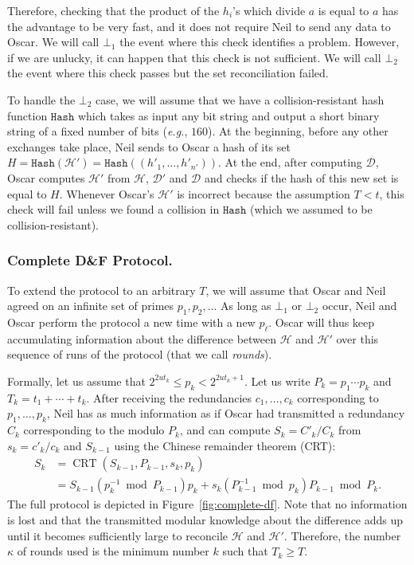 \documentclass[twoside,envcountsame,runningheads]{llncs}
\newcommand{\Set}{\mathcal{H}}
\newcommand{\SetD}{\mathcal{D}}
\newcommand{\df}{D\&F\xspace}
\newcommand{\eg}{\textit{e.g.}\xspace}
\newcommand{\Hash}{\ensuremath{\mathtt{Hash}}}
\DeclareMathOperator{\CRT}{CRT}
\begin{document}
Therefore, checking that the product of the $h_i$'s which divide $a$ is equal to $a$ has the advantage to be very fast, and it does not require Neil to send any data to Oscar. We will call $\bot_1$ the event where this check identifies a problem. 
However, if we are unlucky, it can happen that this check is not sufficient. We will call $\bot_2$ the event where this check passes but the set reconciliation failed.

To handle the $\bot_2$ case, we will assume that we have a collision-resistant hash function $\Hash$ which takes as input any bit string and output a short binary string of a fixed number of bits (\eg, $160$).
At the beginning, before any other exchanges take place, Neil sends to Oscar a hash of its set $H = \Hash(\Set') = \Hash((h'_1,\dots,h'_{n'}))$. At the end, after computing $\SetD$, Oscar computes $\Set'$ from $\Set$, $\SetD'$ and $\SetD$ and checks if the hash of this new set is equal to $H$.
Whenever Oscar's $\Set'$ is incorrect because the assumption $T < t$, this check will fail unless we found a collision in $\Hash$ (which we assumed to be collision-resistant).

\subsubsection{Complete \df Protocol.}
\label{sec:complete-df}

To extend the protocol to an arbitrary $T$, we will assume that Oscar and Neil agreed on an infinite set of primes $p_1,p_2,\ldots$ As long as $\bot_1$ or $\bot_2$ occur, Neil and Oscar perform the protocol a new time with a new $p_\ell$. Oscar will thus keep accumulating information about the difference between $\Set$ and $\Set'$ over this sequence of runs of the protocol (that we call \emph{rounds}).

Formally, let us assume that $2^{2 u t_k} \le p_k < 2^{2 u t_k +1}$.
Let us write $P_k = p_1 \cdots p_k$ and $T_k = t_1 + \cdots + t_k$.
After receiving the redundancies $c_1,\dots,c_k$ corresponding to $p_1,\dots,p_k$, Neil has as much information as if Oscar had transmitted a redundancy $C_k$ corresponding to the modulo $P_k$, and can compute $S_k = C'_k / C_k$ from $s_k = c'_k/c_k$ and $S_{k-1}$ using the Chinese remainder theorem (CRT): 
\begin{align*}
 S_k &= \CRT(S_{k-1},P_{k-1},s_k,p_k) \\
     &= S_{k-1} (p_k^{-1} \bmod P_{k-1}) p_k + s_k (P_{k-1}^{-1} \bmod p_k) P_{k-1} \bmod P_k.
\end{align*}
The full protocol is depicted in Figure~\ref{fig:complete-df}.
Note that no information is lost and that the transmitted modular knowledge about the difference adds up until it becomes sufficiently large to reconcile $\Set$ and $\Set'$.
Therefore, the number $\kappa$ of rounds used is the minimum number $k$ such that $T_k \ge T$.
\end{document}
